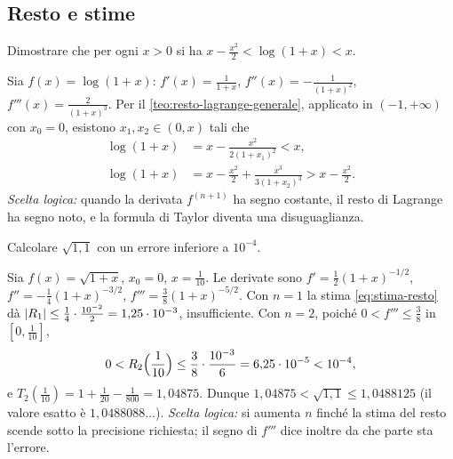 \subsection*{Resto e stime}

\begin{esercizio}\label{es:log-disuguaglianza}
Dimostrare che per ogni $x>0$ si ha $x-\frac{x^{2}}2<\log(1+x)<x$.
\begin{soluzione}
Sia $f(x)=\log(1+x)$: $f'(x)=\frac1{1+x}$, $f''(x)=-\frac1{(1+x)^{2}}$, $f'''(x)=\frac2{(1+x)^{3}}$. Per il
\cref{teo:resto-lagrange-generale}, applicato in $(-1,+\infty)$ con $x_{0}=0$, esistono
$x_{1},x_{2}\in(0,x)$ tali che
\[
\begin{aligned}
  \log(1+x)&=x-\frac{x^{2}}{2(1+x_{1})^{2}}<x,\\
  \log(1+x)&=x-\frac{x^{2}}2+\frac{x^{3}}{3(1+x_{2})^{3}}>x-\frac{x^{2}}2 .
\end{aligned}
\]
\emph{Scelta logica:} quando la derivata $f^{(n+1)}$ ha segno costante, il resto di
Lagrange ha segno noto, e la formula di Taylor diventa una disuguaglianza.
\end{soluzione}
\end{esercizio}

\begin{esercizio}
Calcolare $\sqrt{1{,}1}$ con un errore inferiore a $10^{-4}$.
\begin{soluzione}
Sia $f(x)=\sqrt{1+x}$, $x_{0}=0$, $x=\frac1{10}$. Le derivate sono
$f'=\frac12(1+x)^{-1/2}$, $f''=-\frac14(1+x)^{-3/2}$, $f'''=\frac38(1+x)^{-5/2}$. Con $n=1$ la stima
\eqref{eq:stima-resto} dà $\lvert R_{1}\rvert\le\frac14\cdot\frac{10^{-2}}2=1{,}25\cdot10^{-3}$, insufficiente. Con
$n=2$, poiché $0<f'''\le\frac38$ in $[0,\frac1{10}]$,
\[
  0<R_{2}\Bigl(\frac1{10}\Bigr)\le\frac38\cdot\frac{10^{-3}}{6}=6{,}25\cdot10^{-5}<10^{-4} ,
\]
e $T_{2}(\frac1{10})=1+\frac1{20}-\frac1{800}=1{,}04875$. Dunque
$1{,}04875<\sqrt{1{,}1}\le1{,}0488125$ (il valore esatto è $1{,}0488088\ldots$).
\emph{Scelta logica:} si aumenta $n$ finché la stima del resto scende sotto la precisione richiesta;
il segno di $f'''$ dice inoltre da che parte sta l'errore.
\end{soluzione}
\end{esercizio}

